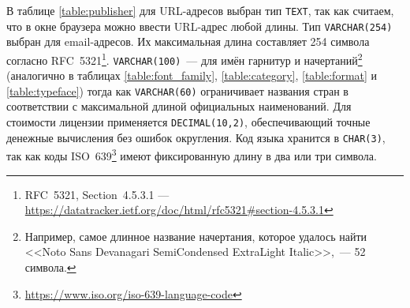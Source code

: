 В таблице \ref{table:publisher} для URL-адресов выбран тип \texttt{TEXT}, так как считаем, что в окне браузера можно ввести URL-адрес любой длины. Тип \texttt{VARCHAR(254)} выбран для email-адресов. Их максимальная длина составляет 254 символа согласно RFC~5321\footnote{RFC~5321, Section~4.5.3.1 --- \url{https://datatracker.ietf.org/doc/html/rfc5321\#section-4.5.3.1}}. \texttt{VARCHAR(100)}~--- для имён гарнитур и начертаний\footnote{Например, самое длинное название начертания, которое удалось найти <<Noto Sans Devanagari SemiCondensed ExtraLight Italic>>,~--- 52 символа.} (аналогично в таблицах \ref{table:font_family}, \ref{table:category}, \ref{table:format} и \ref{table:typeface}) тогда как \texttt{VARCHAR(60)} ограничивает названия стран в соответствии с максимальной длиной официальных наименований. Для стоимости лицензии применяется \texttt{DECIMAL(10,2)}, обеспечивающий точные денежные вычисления без ошибок округления. Код языка хранится в \texttt{CHAR(3)}, так как коды ISO~639\footnote{\url{https://www.iso.org/iso-639-language-code}} имеют фиксированную длину в два или три символа.

